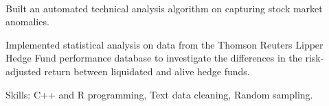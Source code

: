 \documentclass[]{hieudo-build}
\begin{document}
\begin{minipage}[t]{0.65\textwidth}
 \\
\begin{tightemize}
\item Built an automated technical analysis algorithm on capturing stock market anomalies.
\item Implemented statistical analysis on data from the Thomson Reuters Lipper Hedge Fund performance database to investigate the differences in the risk-adjusted return between liquidated and alive hedge funds.
\item Skills: C++ and R programming, Text data cleaning, Random sampling.
\end{tightemize}




\end{minipage}
\end{document}
